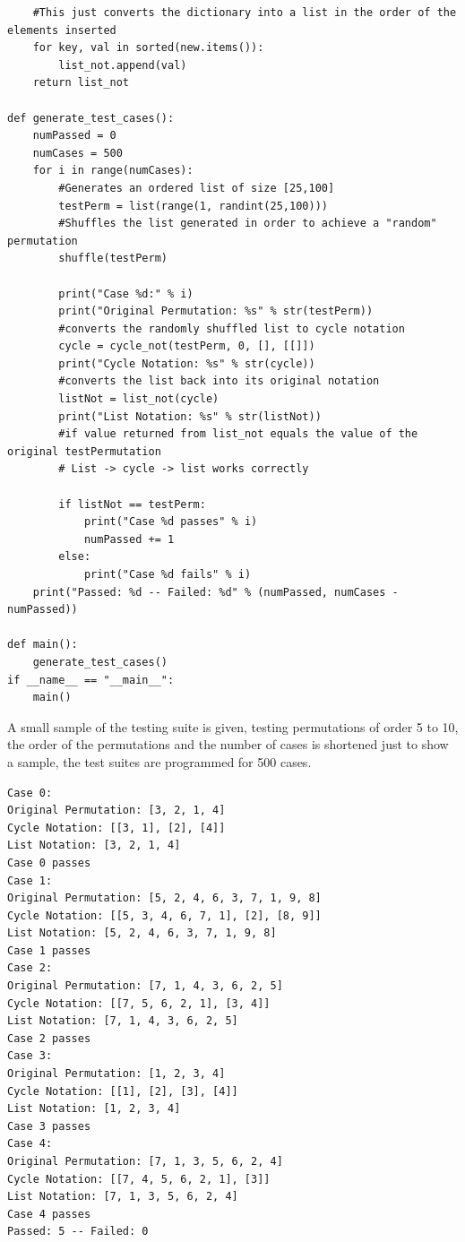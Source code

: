\documentclass[12pt]{article}
\begin{document}
\begin{enumerate}
\begin{lstlisting}
    #This just converts the dictionary into a list in the order of the elements inserted
    for key, val in sorted(new.items()):
        list_not.append(val)
    return list_not

def generate_test_cases():
    numPassed = 0
    numCases = 500
    for i in range(numCases):
        #Generates an ordered list of size [25,100]
        testPerm = list(range(1, randint(25,100)))
        #Shuffles the list generated in order to achieve a "random" permutation
        shuffle(testPerm)

        print("Case %d:" % i)
        print("Original Permutation: %s" % str(testPerm))
        #converts the randomly shuffled list to cycle notation
        cycle = cycle_not(testPerm, 0, [], [[]])
        print("Cycle Notation: %s" % str(cycle))
        #converts the list back into its original notation
        listNot = list_not(cycle)
        print("List Notation: %s" % str(listNot))
        #if value returned from list_not equals the value of the original testPermutation
        # List -> cycle -> list works correctly

        if listNot == testPerm:
            print("Case %d passes" % i)
            numPassed += 1
        else:
            print("Case %d fails" % i)
    print("Passed: %d -- Failed: %d" % (numPassed, numCases - numPassed))

def main():
    generate_test_cases()
if __name__ == "__main__":
    main()
    \end{lstlisting}

    A small sample of the testing suite is given, testing permutations of order 5 to 10, the order of the permutations and the number of cases is shortened just to show a sample, the test suites are programmed for 500 cases.
    \begin{lstlisting}
Case 0:
Original Permutation: [3, 2, 1, 4]
Cycle Notation: [[3, 1], [2], [4]]
List Notation: [3, 2, 1, 4]
Case 0 passes
Case 1:
Original Permutation: [5, 2, 4, 6, 3, 7, 1, 9, 8]
Cycle Notation: [[5, 3, 4, 6, 7, 1], [2], [8, 9]]
List Notation: [5, 2, 4, 6, 3, 7, 1, 9, 8]
Case 1 passes
Case 2:
Original Permutation: [7, 1, 4, 3, 6, 2, 5]
Cycle Notation: [[7, 5, 6, 2, 1], [3, 4]]
List Notation: [7, 1, 4, 3, 6, 2, 5]
Case 2 passes
Case 3:
Original Permutation: [1, 2, 3, 4]
Cycle Notation: [[1], [2], [3], [4]]
List Notation: [1, 2, 3, 4]
Case 3 passes
Case 4:
Original Permutation: [7, 1, 3, 5, 6, 2, 4]
Cycle Notation: [[7, 4, 5, 6, 2, 1], [3]]
List Notation: [7, 1, 3, 5, 6, 2, 4]
Case 4 passes
Passed: 5 -- Failed: 0
    \end{lstlisting}
    

\end{enumerate}
\end{document}
